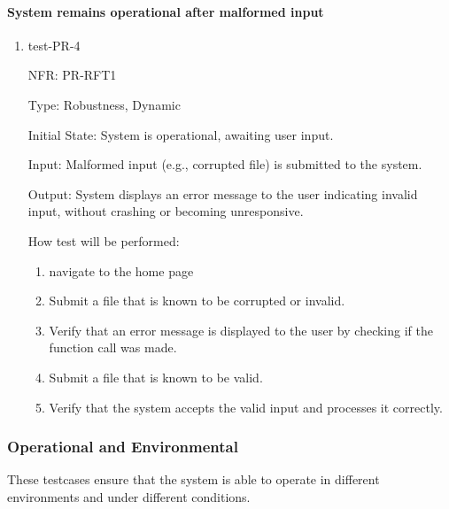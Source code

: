 \documentclass[12pt, titlepage]{article}
\begin{document}
\paragraph{System remains operational after malformed input}
\begin{enumerate}
  \item{test-PR-4}

  NFR: PR-RFT1

  Type: Robustness, Dynamic
            
  Initial State: System is operational, awaiting user input.
            
  Input:  Malformed input (e.g., corrupted file) is submitted to the system.
            
  Output: System displays an error message to the user indicating invalid input, without crashing or becoming unresponsive.
            
  How test will be performed: 
  \begin{enumerate}
    \item navigate to the home page
    \item Submit a file that is known to be corrupted or invalid.
    \item Verify that an error message is displayed to the user by checking if the function call was made.
    \item Submit a file that is known to be valid.
    \item Verify that the system accepts the valid input and processes it correctly.
  \end{enumerate}
\end{enumerate}

\subsubsection{Operational and Environmental}
These testcases ensure that the system is able to operate in different environments and under different conditions.
\end{document}
